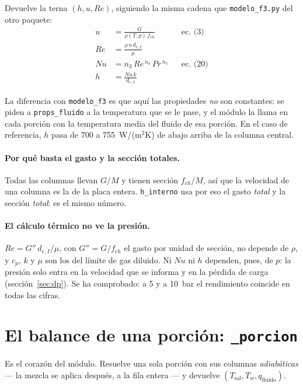 \documentclass[11pt,a4paper]{article}
\begin{document}
Devuelve la terna $(h, u, Re)$, siguiendo la misma cadena que
\texttt{modelo\_f3.py} del otro paquete:
\begin{align}
  u  &= \frac{G}{\rho(T,p)\,f_{ch}}             && \text{ec.\ (3)} \\
  Re &= \frac{\rho\,u\,d_{e,I}}{\mu}            && \\
  Nu &= n_3\,Re^{\,n_4}\,Pr^{\,n_5}             && \text{ec.\ (20)} \\
  h  &= \frac{Nu\,k}{d_{e,I}}                   &&
\end{align}

La diferencia con \texttt{modelo\_f3} es que aquí las propiedades \emph{no} son
constantes: se piden a \texttt{props\_fluido} a la temperatura que se le pase, y
el módulo la llama en cada porción con la temperatura media del fluido de esa
porción. En el caso de referencia, $h$ pasa de 700 a 755~W/(m$^2$K) de abajo
arriba de la columna central.

\paragraph{Por qué basta el gasto y la sección totales.} Todas las columnas
llevan $G/M$ y tienen sección $f_{ch}/M$, así que la velocidad de una columna es
la de la placa entera. \texttt{h\_interno} usa por eso el gasto \emph{total} y la
sección \emph{total}: es el mismo número.

\paragraph{El cálculo térmico no ve la presión.} $Re = G''\,d_{e,I}/\mu$, con
$G'' = G/f_{ch}$ el gasto por unidad de sección, no depende de $\rho$, y $c_p$,
$k$ y $\mu$ son los del límite de gas diluido. Ni $Nu$ ni $h$ dependen, pues, de
$p$: la presión solo entra en la velocidad que se informa y en la pérdida de
carga (sección~\ref{sec:dp}). Se ha comprobado: a 5 y a 10~bar el rendimiento
coincide en todas las cifras.

\section{El balance de una porción: \texttt{\_porcion}}
\label{sec:porcion}

Es el corazón del módulo. Resuelve una sola porción con sus columnas
\emph{adiabáticas} --- la mezcla se aplica después, a la fila entera --- y
devuelve $(T_{\mathrm{sal}}, T_w, q_{\mathrm{fluido}})$.
\end{document}
